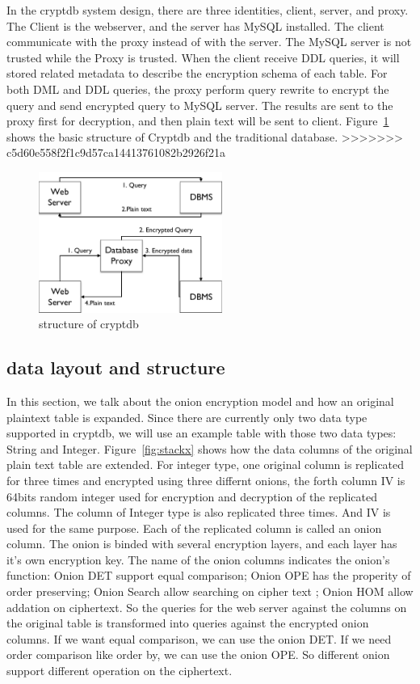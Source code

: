 In the cryptdb system design, there are three identities, client, server, and proxy. The Client is the webserver, and the server has MySQL installed. The client communicate with the proxy instead of with the server. The MySQL server is not trusted while the Proxy is trusted. When the client receive DDL queries, it will stored related metadata to describe the encryption schema of each table. For both DML and DDL queries, the proxy perform query rewrite to encrypt the query and send encrypted query to MySQL server. The results are sent to the proxy first for decryption, and then plain text will be sent to client. Figure~\ref{fig:stack1} shows the basic structure of Cryptdb and the traditional database. 
>>>>>>> c5d60e558f2f1c9d57ca14413761082b2926f21a


\begin{figure}[tb]
\centering
\includegraphics[width=6cm]{images/Cryptdb-structure.pdf}
\caption{structure of cryptdb}
\label{fig:stack1}
\end{figure}



\subsection{data layout and structure}

In this section, we talk about the onion encryption model and how an original plaintext table is expanded. Since there are currently only two data type supported in cryptdb, we will use an example table with those two data types: String and Integer. Figure~\ref{fig:stackx} shows how the data columns of the original plain text table are extended. For integer type, one original column is replicated for three times and encrypted using three differnt onions, the forth column IV is 64bits random integer used for encryption and decryption of the replicated columns. The column of Integer type is also replicated three times. And IV is used for the same purpose. Each of the replicated column is called an onion column. The onion is binded with several encryption layers, and each layer has it's own encryption key. The name of the onion columns indicates the onion's function: Onion DET support equal comparison; Onion OPE has the properity of order preserving; Onion Search allow searching on cipher text ; Onion HOM allow addation on ciphertext. So the queries for the web server against the columns on the original table is transformed into queries against the encrypted onion columns. If we want equal comparison, we can use the onion DET. If we need order comparison like order by, we can use the onion OPE. So different onion support different operation on the ciphertext. 




